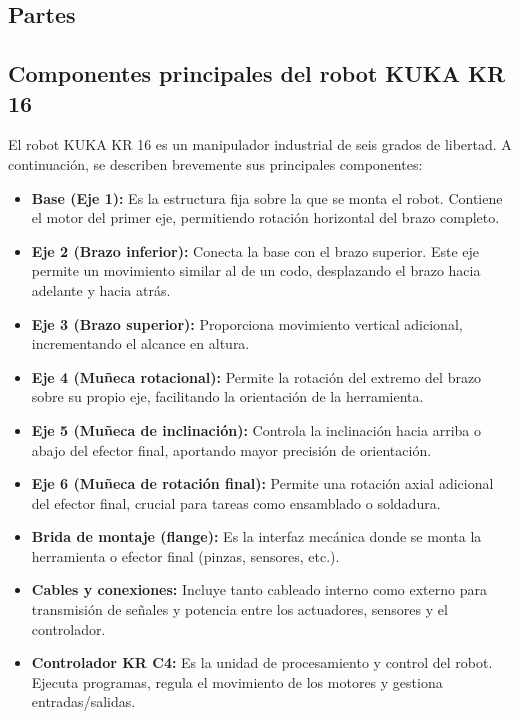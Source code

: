 \subsection{Partes} \label{subsec:partes}
\subsection*{Componentes principales del robot KUKA KR 16}

El robot KUKA KR 16 es un manipulador industrial de seis grados de libertad. A continuación, se describen brevemente sus principales componentes:

\begin{itemize}
	\item \textbf{Base (Eje 1):} Es la estructura fija sobre la que se monta el robot. Contiene el motor del primer eje, permitiendo rotación horizontal del brazo completo.
	
	\item \textbf{Eje 2 (Brazo inferior):} Conecta la base con el brazo superior. Este eje permite un movimiento similar al de un codo, desplazando el brazo hacia adelante y hacia atrás.
	
	\item \textbf{Eje 3 (Brazo superior):} Proporciona movimiento vertical adicional, incrementando el alcance en altura.
	
	\item \textbf{Eje 4 (Muñeca rotacional):} Permite la rotación del extremo del brazo sobre su propio eje, facilitando la orientación de la herramienta.
	
	\item \textbf{Eje 5 (Muñeca de inclinación):} Controla la inclinación hacia arriba o abajo del efector final, aportando mayor precisión de orientación.
	
	\item \textbf{Eje 6 (Muñeca de rotación final):} Permite una rotación axial adicional del efector final, crucial para tareas como ensamblado o soldadura.
	
	\item \textbf{Brida de montaje (flange):} Es la interfaz mecánica donde se monta la herramienta o efector final (pinzas, sensores, etc.).
	
	\item \textbf{Cables y conexiones:} Incluye tanto cableado interno como externo para transmisión de señales y potencia entre los actuadores, sensores y el controlador.
	
	\item \textbf{Controlador KR C4:} Es la unidad de procesamiento y control del robot. Ejecuta programas, regula el movimiento de los motores y gestiona entradas/salidas.
	
\end{itemize}

